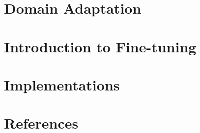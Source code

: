\section[DA]{Domain Adaptation}


\section[Intro]{Introduction to Fine-tuning}


\section[Impl]{Implementations}






\section[Refs]{References}
